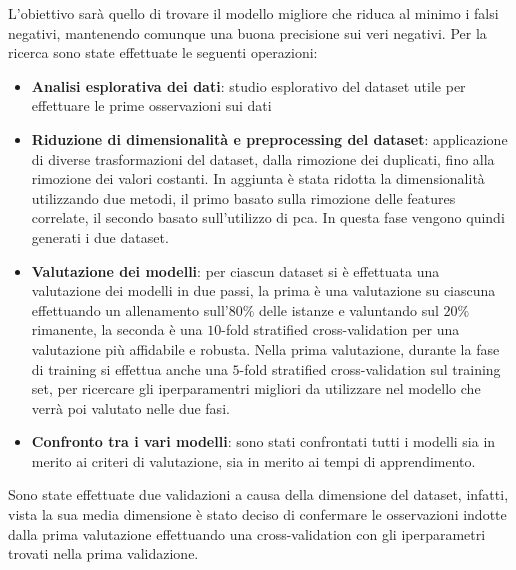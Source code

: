 L'obiettivo sarà quello di trovare il modello migliore che riduca al minimo i falsi 
negativi, mantenendo comunque una buona precisione sui veri negativi. Per la ricerca
sono state effettuate le seguenti operazioni:
\begin{itemize}
    \item \textbf{Analisi esplorativa dei dati}: studio esplorativo del dataset
    utile per effettuare le prime osservazioni sui dati
    \item \textbf{Riduzione di dimensionalità e preprocessing del dataset}: 
    applicazione di diverse trasformazioni del dataset, dalla rimozione dei duplicati,
    fino alla rimozione dei valori costanti. In aggiunta è stata ridotta la dimensionalità
    utilizzando due metodi, il primo basato sulla rimozione delle features correlate,
    il secondo basato sull'utilizzo di pca. In questa fase vengono quindi generati 
    i due dataset.
    \item \textbf{Valutazione dei modelli}: per ciascun dataset si è effettuata 
    una valutazione dei modelli in due passi, la prima è una valutazione su ciascuna 
    effettuando un allenamento sull'$80\%$ delle istanze e valuntando sul $20\%$
    rimanente, la seconda è una $10$-fold stratified cross-validation per una valutazione
    più affidabile e robusta. 
    Nella prima valutazione, durante la fase di training si effettua anche una 
    $5$-fold stratified cross-validation sul training set, per ricercare gli 
    iperparamentri migliori da utilizzare nel modello che verrà poi valutato nelle 
    due fasi.
    \item \textbf{Confronto tra i vari modelli}: sono stati confrontati tutti
    i modelli sia in merito ai criteri di valutazione, sia in merito ai tempi 
    di apprendimento.
\end{itemize}

Sono state effettuate due validazioni a causa della dimensione
del dataset, infatti, vista la sua media dimensione è stato deciso di confermare
le osservazioni indotte dalla prima valutazione effettuando una cross-validation
con gli iperparametri trovati nella prima validazione. 


